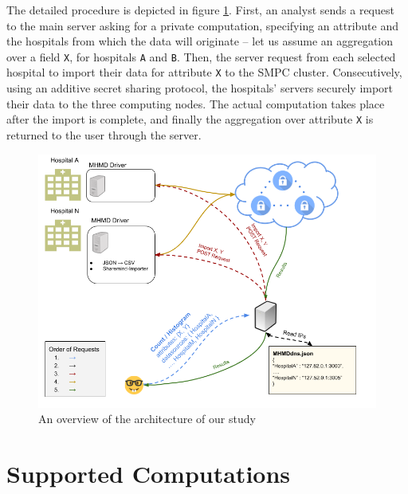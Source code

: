 The detailed procedure is depicted in figure \ref{f:overview}.
First, an analyst sends a request to the main server asking for a private computation, specifying an attribute and the hospitals from which the data will originate -- let us assume an aggregation over a field \texttt{X}, for hospitals \texttt{A} and \texttt{B}.
Then, the server request from each selected hospital to import their data for attribute \texttt{X} to the SMPC cluster.
Consecutively, using an additive secret sharing protocol, the hospitals' servers securely import their data to the three computing nodes.
The actual computation takes place after the import is complete, and finally the aggregation over attribute \texttt{X} is returned to the user through the server.



\begin{figure}[th]
  \centering
  \includegraphics[width=\linewidth]{figures/overview.png}
  \caption{An overview of the architecture of our study}\label{f:overview}
\end{figure}



\section{Supported Computations}\label{s:computations}






